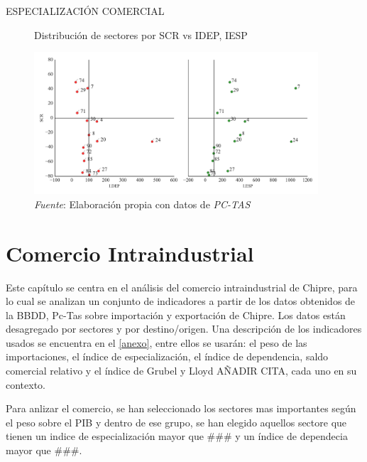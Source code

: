 \documentclass[a4paper,openright,12pt]{book}
\begin{document}
ESPECIALIZACIÓN COMERCIAL

\begin{figure}[ht]
    \centering
    \caption{Distribución de sectores por SCR vs IDEP, IESP}
    \includegraphics[width=400px]{cuadrantes2.pdf}
    \caption*{\textit{Fuente}: Elaboración propia con datos de \textit{PC-TAS}}
    \label{sec_scr_idep_iesp}
\end{figure}


\chapter{Comercio Intraindustrial}

Este capítulo se centra en el análisis del comercio intraindustrial de Chipre, para lo cual se analizan un conjunto de indicadores a partir de los datos obtenidos de la BBDD, Pc-Tas sobre importación y exportación de Chipre. Los datos están desagregado por sectores y por destino/origen. Una descripción de los indicadores usados se encuentra en el \ref{anexo}, entre ellos se usarán: el peso de las importaciones, el índice de especialización, el índice de dependencia, saldo comercial relativo y el índice de Grubel y Lloyd AÑADIR CITA, cada uno en su contexto.

Para anlizar el comercio, se han seleccionado los sectores mas importantes según el peso sobre el PIB y dentro de ese grupo, se han elegido aquellos sectore que tienen un indice de especialización mayor que ### y un índice de dependecia mayor que ###.
\end{document}
